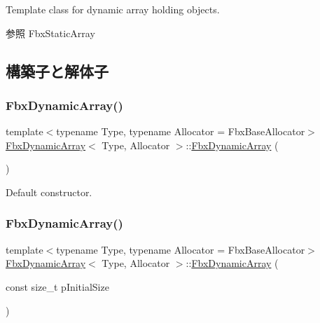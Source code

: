 Template class for dynamic array holding objects.

\begin{DoxySeeAlso}{参照}
Fbx\+Static\+Array 
\end{DoxySeeAlso}


\subsection{構築子と解体子}
\mbox{\label{class_fbx_dynamic_array_a279819589a3ae9252213f2efeddec299}} 
\subsubsection{\texorpdfstring{Fbx\+Dynamic\+Array()}{FbxDynamicArray()}\hspace{0.1cm}{\footnotesize\ttfamily [1/3]}}
{\footnotesize\ttfamily template$<$typename Type, typename Allocator = Fbx\+Base\+Allocator$>$ \\
\hyperlink{class_fbx_dynamic_array}{Fbx\+Dynamic\+Array}$<$ Type, Allocator $>$\+::\hyperlink{class_fbx_dynamic_array}{Fbx\+Dynamic\+Array} (\begin{DoxyParamCaption}{ }\end{DoxyParamCaption})}



Default constructor. 

\mbox{\label{class_fbx_dynamic_array_a51406444b76ab195c4d87ab456385281}} 
\subsubsection{\texorpdfstring{Fbx\+Dynamic\+Array()}{FbxDynamicArray()}\hspace{0.1cm}{\footnotesize\ttfamily [2/3]}}
{\footnotesize\ttfamily template$<$typename Type, typename Allocator = Fbx\+Base\+Allocator$>$ \\
\hyperlink{class_fbx_dynamic_array}{Fbx\+Dynamic\+Array}$<$ Type, Allocator $>$\+::\hyperlink{class_fbx_dynamic_array}{Fbx\+Dynamic\+Array} (\begin{DoxyParamCaption}\item[{const size\+\_\+t}]{p\+Initial\+Size }\end{DoxyParamCaption})}

